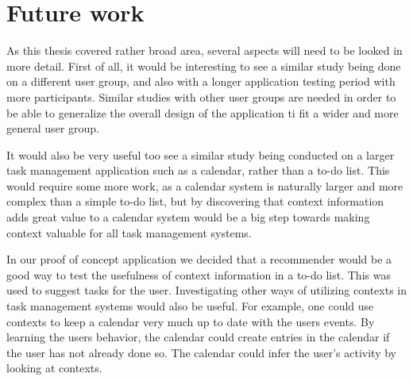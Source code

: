 \chapter{Future work}
\label{chap:futurework}

As this thesis covered rather broad area, several aspects will need to be looked in more detail. First of all, it would be interesting to see a similar study being done on a different user group, and also with a longer application testing period with more participants. Similar studies with other user groups are needed in order to be able to generalize the overall design of the application ti fit a wider and more general user group.

It would also be very useful too see a similar study being conducted on a larger task management application such as a calendar, rather than a to-do list. This would require some more work, as a calendar system is naturally larger and more complex than a simple to-do list, but by discovering that context information adds great value to a calendar system would be a big step towards making context valuable for all task management systems.

In our proof of concept application we decided that a recommender would be a good way to test the usefulness of context information in a to-do list. This was used to suggest tasks for the user. Investigating other ways of utilizing contexts in task management systems would also be useful. For example, one could use contexts to keep a calendar very much up to date with the users events. By learning the users behavior, the calendar could create entries in the calendar if the user has not already done so. The calendar could infer the user's activity by looking at contexts. 